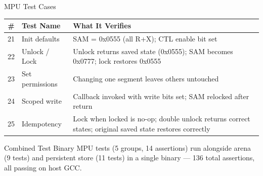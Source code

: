 \documentclass[aspectratio=169, 10pt]{beamer}
\begin{document}
\begin{frame}{MPU Test Cases}
\begin{table}
\centering
\small
\begin{tabular}{@{}clp{7.5cm}@{}}
\toprule
\textbf{\#} & \textbf{Test Name} & \textbf{What It Verifies} \\
\midrule
21 & Init defaults       & SAM = 0x0555 (all R+X); CTL enable bit set \\
22 & Unlock / Lock       & Unlock returns saved state (0x0555); SAM becomes 0x0777;
                           lock restores 0x0555 \\
23 & Set permissions     & Changing one segment leaves others untouched \\
24 & Scoped write        & Callback invoked with write bits set; SAM relocked after return \\
25 & Idempotency         & Lock when locked is no-op; double unlock returns correct states;
                           original saved state restores correctly \\
\bottomrule
\end{tabular}
\end{table}

\vspace{0.5em}
\begin{block}{Combined Test Binary}
MPU tests (5 groups, 14 assertions) run alongside arena (9 tests) and
persistent store (11 tests) in a single binary --- 136 total assertions,
all passing on host GCC.
\end{block}
\end{frame}
\end{document}
